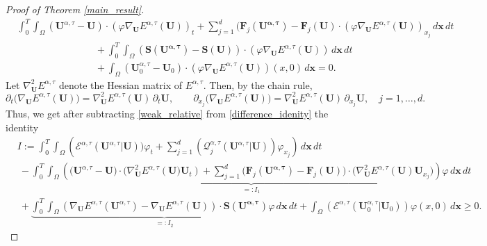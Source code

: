 \documentclass[11pt]{article}
\numberwithin{equation}{section}
\newtheorem{counter example}[theorem]{Counter Example}
\numberwithin{equation}{section}
\numberwithin{equation}{section}
\newcommand{\rel}{^{\alpha, \tau}}
\begin{document}
\begin{proof}[Proof of Theorem \ref{main_result}]
\begin{equation}\label{weak_relative}
\begin{aligned}
    &\int_{0}^{T}\int_{\Omega} (\mathbf{U}\rel-\mathbf{{U}})\cdot (\varphi \nabla_{\mathbf{U}} E^{\alpha, \tau}(\mathbf{{U}}))_t+\sum_{j=1}^{d}(\mathbf{F}_j\mathbf{(U\rel)}-\mathbf{F}_j\mathbf{({U})}\cdot(\varphi\nabla_{\mathbf{U}} E^{\alpha, \tau}(\mathbf{{U}}))_{x_j}\, d\mathbf{x}\, dt\\
    &\qquad\qquad\qquad\qquad+\int_{0}^{T}\int_{\Omega} (\mathbf{S(U\rel)}-\mathbf{{S}({U})})\cdot (\varphi \nabla_{\mathbf{U}} E^{\alpha, \tau}(\mathbf{{U}})) \, d\mathbf{x}\, dt \\
    &\qquad\qquad\qquad\qquad+\int_{\Omega} (\mathbf{U}\rel_0-\mathbf{{U}}_0)\cdot (\varphi\nabla_{\mathbf{U}} E^{\alpha, \tau}(\mathbf{{U}}))( x, 0)\, d\mathbf{x}= 0. 
\end{aligned}
\end{equation}
Let $\nabla_{\mathbf U}^2 E^{\alpha,\tau}$ denote the Hessian matrix of
$E^{\alpha,\tau}$. Then, by the chain rule,
\[
\partial_t\big(\nabla_{\mathbf U}E^{\alpha,\tau}(\mathbf U)\big)
=
\nabla_{\mathbf U}^2E^{\alpha,\tau}(\mathbf U)\,\partial_t\mathbf U,
\qquad
\partial_{x_j}\big(\nabla_{\mathbf U}E^{\alpha,\tau}(\mathbf U)\big)
=
\nabla_{\mathbf U}^2E^{\alpha,\tau}(\mathbf U)\,\partial_{x_j}\mathbf U,
\quad j=1,\dots,d.
\]
Thus, we get after  subtracting \eqref{weak_relative} from \eqref{difference_idenity}  the identity 
\begin{equation}\label{difference_idenity_weak_form}
\begin{aligned}
    &I:=\int_{0}^{T}\int_{\Omega} \left(\mathcal{E}^{\alpha, \tau}(\mathbf{U}\rel|\mathbf{{U}}))\varphi_t+\sum_{j=1}^{d}(\mathcal{Q}^{\alpha, \tau}_j(\mathbf{U}\rel|\mathbf{{U}}))\varphi_{x_j}\right) \, d\mathbf{x}\, dt\\
&~-\underbrace{\int_{0}^{T}\int_{\Omega} \left(\big(\mathbf{U}\rel-\mathbf{{U}}\big)\cdot\big( \nabla^2_{\mathbf{{U}}} E^{\alpha, \tau}(\mathbf{U}\big)\mathbf{{U}}_t) +\sum_{j=1}^{d}\big(\mathbf{F}_j\mathbf{(U\rel)}-\mathbf{F}_j\mathbf{({U})})\cdot(\nabla^2_\mathbf{U} E^{\alpha, \tau}(\mathbf{{U}}) \mathbf{{U}}_{x_j}\big)\right) \varphi\, d\mathbf{x}\, dt}_{=:I_1}\\
&~+\underbrace{\int_{0}^{T}\int_{\Omega}\left(\nabla_{\mathbf{U}}E^{\alpha, \tau}(\mathbf{U}\rel)-\nabla_{\mathbf{U}}E^{\alpha, \tau}(\mathbf{{U}})\right)\cdot \mathbf{S(U\rel)} \varphi\, d\mathbf{x}\, dt}_{=:I_2}+\int_{\Omega} \left(\mathcal{E}^{\alpha, \tau}(\mathbf{U}_0\rel|\mathbf{{U}}_0)\right)\varphi(x,0)\, d\mathbf{x}\geq 0. 

\end{aligned}
\end{equation}
\end{proof}
\end{document}
